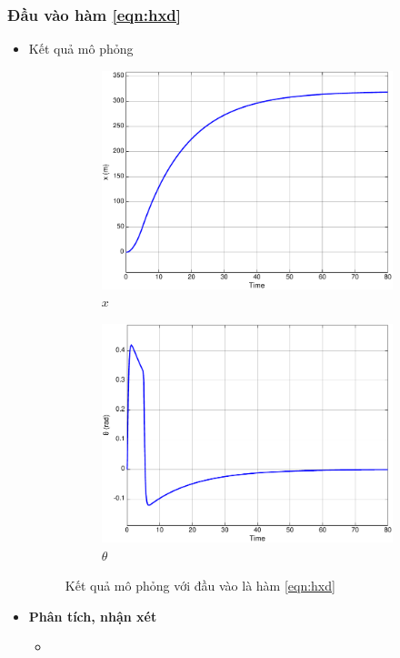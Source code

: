 \documentclass[12pt,a4paper]{article}
\begin{document}
\subsubsection{Đầu vào hàm \eqref{eqn:hxd}}
\begin{itemize}
    \item Kết quả mô phỏng 
    \begin{figure}[ht]
        \centering
        \begin{subfigure}[b]{0.495\linewidth}
            \centering
            \includegraphics[width=\linewidth]{phan_tich_x_f.pdf}
            \caption{$x$}
        \end{subfigure}\hfill
        \begin{subfigure}[b]{0.495\linewidth}
            \centering
            \includegraphics[width=\linewidth]{phan_tich_theta_f.pdf}
            \caption{$\theta$}
        \end{subfigure}
        \caption{Kết quả mô phỏng với đầu vào là hàm \eqref{eqn:hxd}}
    \end{figure}
    \item \textbf{Phân tích, nhận xét}
    \begin{itemize}
        \item 
    \end{itemize}
\end{itemize}
\end{document}
